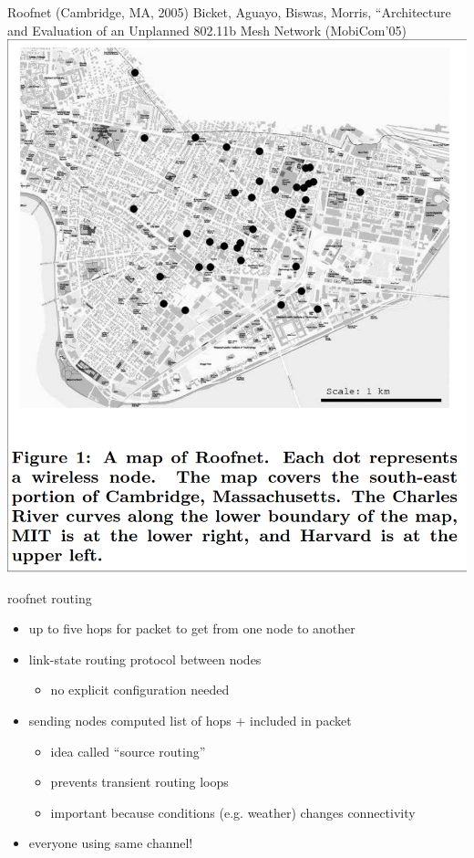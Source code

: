 \begin{frame}{Roofnet (Cambridge, MA, 2005)}
{\fontsize{9}{10}\selectfont Bicket, Aguayo, Biswas, Morris, ``Architecture and Evaluation of
an Unplanned 802.11b Mesh Network (MobiCom'05)}
\includegraphics[height=0.8\textheight]{../multiaccess/roofnet-fig1}
\end{frame}

\begin{frame}{roofnet routing}
    \begin{itemize}
    \item up to five hops for packet to get from one node to another
    \item link-state routing protocol between nodes
        \begin{itemize}
        \item no explicit configuration needed
        \end{itemize}
    \item sending nodes computed list of hops + included in packet
        \begin{itemize}
        \item idea called ``source routing''
        \item prevents transient routing loops
        \item important because conditions (e.g. weather) changes connectivity
        \end{itemize}
    \item everyone using same channel!
    \end{itemize}
\end{frame}

